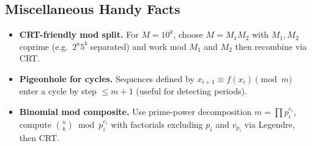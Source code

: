 \documentclass[9pt]{extarticle}
\begin{document}
\subsection{Miscellaneous Handy Facts}
\begin{itemize}
  \item \textbf{CRT-friendly mod split.} For $M=10^k$, choose $M=M_1M_2$ with $M_1,M_2$ coprime (e.g.\ $2^a5^b$ separated) and work mod $M_1$ and $M_2$ then recombine via CRT.
  \item \textbf{Pigeonhole for cycles.} Sequences defined by $x_{i+1}\equiv f(x_i)\pmod m$ enter a cycle by step $\le m+1$ (useful for detecting periods).
  \item \textbf{Binomial mod composite.} Use prime-power decomposition $m=\prod p_i^{e_i}$, compute $\binom{n}{k}\bmod p_i^{e_i}$ with factorials excluding $p_i$ and $v_{p_i}$ via Legendre, then CRT.
\end{itemize}
\newpage
\end{document}

